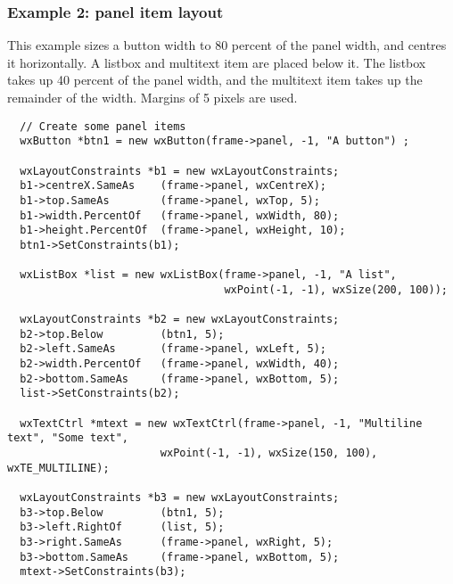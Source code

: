 \subsubsection{Example 2: panel item layout}

This example sizes a button width to 80 percent of the panel width, and centres
it horizontally. A listbox and multitext item are placed below it. The listbox
takes up 40 percent of the panel width, and the multitext item takes up
the remainder of the width. Margins of 5 pixels are used.

\begin{verbatim}
  // Create some panel items
  wxButton *btn1 = new wxButton(frame->panel, -1, "A button") ;

  wxLayoutConstraints *b1 = new wxLayoutConstraints;
  b1->centreX.SameAs    (frame->panel, wxCentreX);
  b1->top.SameAs        (frame->panel, wxTop, 5);
  b1->width.PercentOf   (frame->panel, wxWidth, 80);
  b1->height.PercentOf  (frame->panel, wxHeight, 10);
  btn1->SetConstraints(b1);

  wxListBox *list = new wxListBox(frame->panel, -1, "A list",
                                  wxPoint(-1, -1), wxSize(200, 100));

  wxLayoutConstraints *b2 = new wxLayoutConstraints;
  b2->top.Below         (btn1, 5);
  b2->left.SameAs       (frame->panel, wxLeft, 5);
  b2->width.PercentOf   (frame->panel, wxWidth, 40);
  b2->bottom.SameAs     (frame->panel, wxBottom, 5);
  list->SetConstraints(b2);

  wxTextCtrl *mtext = new wxTextCtrl(frame->panel, -1, "Multiline text", "Some text",
                        wxPoint(-1, -1), wxSize(150, 100), wxTE_MULTILINE);

  wxLayoutConstraints *b3 = new wxLayoutConstraints;
  b3->top.Below         (btn1, 5);
  b3->left.RightOf      (list, 5);
  b3->right.SameAs      (frame->panel, wxRight, 5);
  b3->bottom.SameAs     (frame->panel, wxBottom, 5);
  mtext->SetConstraints(b3);
\end{verbatim}


